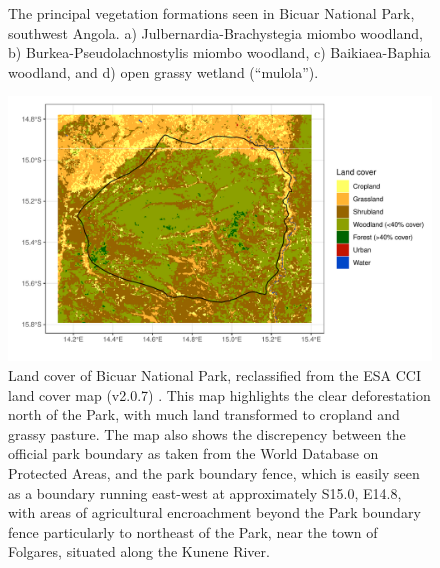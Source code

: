 \begin{refsection}
\begin{figure}[tb]
	\hfil

	\label{intro:bicuar_photos}
	\caption[Bicuar National Park vegetation type photographs]{The principal vegetation formations seen in Bicuar National Park, southwest Angola. a) Julbernardia-Brachystegia miombo woodland, b) Burkea-Pseudolachnostylis miombo woodland, c) Baikiaea-Baphia woodland, and d) open grassy wetland (``mulola'').}
\end{figure}

\begin{figure}[tb]
\centering
	\includegraphics[width=\textwidth]{img/bicuar_land_cover}
	\caption[Bicuar National Park land cover]{Land cover of Bicuar National Park, reclassified from the ESA CCI land cover map (v2.0.7) \citep{ESACCI}. This map highlights the clear deforestation north of the Park, with much land transformed to cropland and grassy pasture. The map also shows the discrepency between the official park boundary as taken from the World Database on Protected Areas, and the park boundary fence, which is easily seen as a boundary running east-west at approximately S15.0\textdegree{}, E14.8\textdegree{}, with areas of agricultural encroachment beyond the Park boundary fence particularly to northeast of the Park, near the town of Folgares, situated along the Kunene River.}
	\label{intro:bicuar_land_cover}
\end{figure}



\end{refsection}
